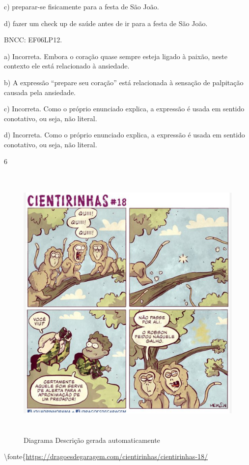 c) preparar-se fisicamente para a festa de São João.

d) fazer um check up de saúde antes de ir para a festa de São João.

BNCC: EF06LP12.

a) Incorreta. Embora o coração quase sempre esteja ligado à paixão,
neste contexto ele está relacionado à ansiedade.

b) A expressão ``prepare seu coração'' está relacionada à sensação de
palpitação causada pela ansiedade.

c) Incorreta. Como o próprio enunciado explica, a expressão é usada em
sentido conotativo, ou seja, não literal.

d) Incorreta. Como o próprio enunciado explica, a expressão é usada em
sentido conotativo, ou seja, não literal.

\num{6}

\begin{figure}
\centering
\includegraphics[width=5.19864in,height=5.50077in]{./imgSAEB_6_POR/media/image41.png}
\caption{Diagrama Descrição gerada automaticamente}
\end{figure}

\textbackslash fonte\{\url{https://dragoesdegaragem.com/cientirinhas/cientirinhas-18/}

